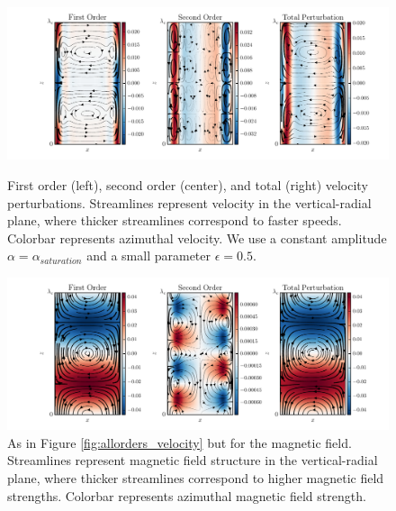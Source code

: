 \documentclass[twocolumn]{aastex61}
\begin{document}
\begin{figure}
\centering
\includegraphics[width=\textwidth]{thingap_streamfuncs_velocity_Pm_1E-3-eps-converted-to.pdf}
\caption{First order (left), second order (center), and total (right) velocity perturbations. Streamlines represent velocity in the vertical-radial plane, where thicker streamlines correspond to faster speeds. Colorbar represents azimuthal velocity. We use a constant amplitude $\alpha = \alpha_{saturation}$ and a small parameter $\epsilon = 0.5$.}\label{fig:allorders_velocity}
\vspace*{\floatsep}
\centering
\includegraphics[width=\textwidth]{thingap_streamfuncs_Bfield_Pm_1E-3-eps-converted-to.pdf}
\caption{As in Figure \ref{fig:allorders_velocity} but for the magnetic field. Streamlines represent magnetic field structure in the vertical-radial plane, where thicker streamlines correspond to higher magnetic field strengths. Colorbar represents azimuthal magnetic field strength.}\label{fig:allorders_Bfield}
\end{figure}
\end{document}
